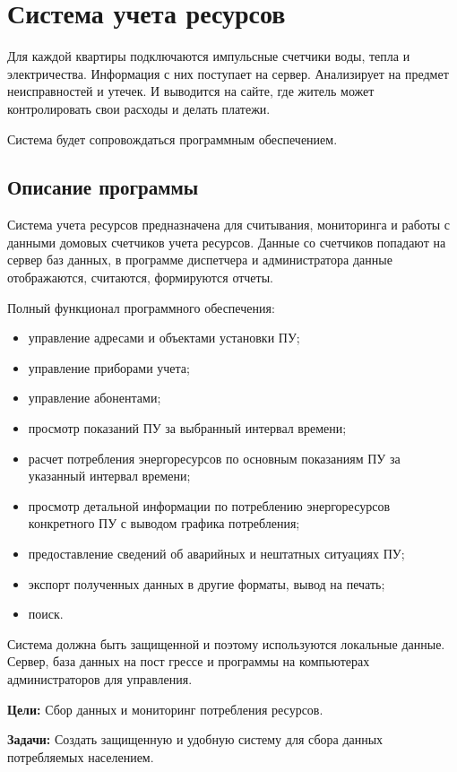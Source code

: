 
\section{Система учета ресурсов}
Для каждой квартиры подключаются импульсные счетчики воды, тепла и электричества. Информация с них поступает на сервер. Анализирует на предмет неисправностей и утечек. И выводится на сайте, где житель может контролировать свои расходы и делать платежи.

Система будет сопровождаться программным обеспечением.
\subsection{Описание программы}
Система учета ресурсов предназначена для считывания, мониторинга и работы с данными домовых счетчиков учета ресурсов. Данные со счетчиков попадают на сервер баз данных, в программе диспетчера и администратора данные отображаются, считаются, формируются отчеты.

Полный функционал программного обеспечения:
\begin{itemize}
\item управление адресами и объектами установки ПУ;
\item управление приборами учета;
\item управление абонентами; 
\item просмотр показаний ПУ за выбранный интервал времени; 
\item расчет потребления энергоресурсов по основным показаниям ПУ за указанный интервал времени; 
\item просмотр детальной информации по потреблению энергоресурсов конкретного ПУ с выводом графика потребления; 
\item предоставление сведений об аварийных и нештатных ситуациях ПУ; 
\item экспорт полученных данных в другие форматы, вывод на печать;
\item поиск.
\end{itemize}

Система должна быть защищенной и поэтому используются локальные данные. Сервер, база данных на пост грессе и программы на компьютерах администраторов для управления. 

\textbf{Цели:} Сбор данных и мониторинг потребления ресурсов.
 
\textbf{Задачи:}  Создать защищенную и удобную систему  для сбора данных потребляемых населением.

